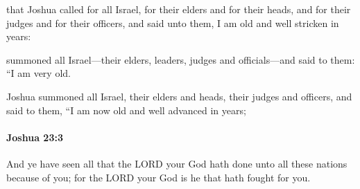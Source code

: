 			\begin{versebox}
					\item[BHS] 
					\item[ASV] that Joshua called for all Israel, for their elders and for their heads, and for their judges and for their officers, and said unto them, I am old and well stricken in years:
					\item[NIV] summoned all Israel—their elders, leaders, judges and officials—and said to them: “I am very old.
					\item[NRSV] Joshua summoned all Israel, their elders and heads, their judges and officers, and said to them, “I am now old and well advanced in years;
			\end{versebox}

		\paragraph{Joshua 23:3} %
			\label{JOSHUA-23-3}

			And ye have seen all that the LORD your God hath done unto all these nations because of you; for the LORD your God is he that hath fought for you.


